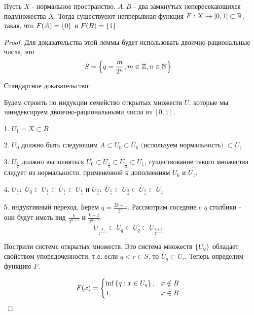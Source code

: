 \begin{theorem}
    Пусть $X$ - нормальное пространство. $A, B$ - два замкнутых непересекающихся подмножества $X$. Тогда существуеют непрерывная функция $F: X \rightarrow [0, 1] \subset \mathbb{R}$, такая, что $F(A) = \left\{0\right\}$ и $F(B) = \left\{1\right\}$
\end{theorem}
\begin{proof}
    Для доказательства этой леммы будет использовать двоично-рациональные числа, это
    \[
        S = \left\{q = \frac{m}{2^n}, m \in \mathbb{Z}, n \in \mathbb{N}\right\}
    \]

    Стандартное доказательство: 
        
        Будем строить по индукции семейство открытых множеств $U$, которые мы заиндексируем двоично-рациональными числа из $[0, 1]$.
        
            1. $U_1 = X \subset B$
            
            2. $U_0$ должно быть следующим $A \subset U_0 \subset \overline{U}_0 \textbf{ (используем нормальность) } \subset U_1$

            3. $U_{\frac{1}{2}}$ должно выполняться $\overline{U}_0 \subset U_{\frac{1}{2}} \subset \overline{U}_{\frac{1}{2}} \subset U_1$, cуществование такого множества следует из нормальности, примененной к дополнениям $U_0$ и $U_1$.

            4. $U_{\frac{1}{4}}:$ $\overline{U}_0 \subset U_{\frac{1}{4}} \subset \overline{U}_{\frac{1}{4}} \subset U_{\frac{1}{2}}$ и $U_{\frac{3}{4}}:$ $\overline{U}_\frac{1}{2} \subset U_{\frac{3}{4}} \subset \overline{U}_{\frac{3}{4}} \subset U_{1}$

            5. индуктивный переход. Берем $q = \frac{2k + 1}{2^n}$. Рассмотрим соседние c $q$ столбики - они будут иметь вид $\frac{k}{2^{n - 1}}$ и $\frac{k + 1}{2^{n - 1}}$.
            \[
                \overline{U}_{\frac{k}{2^{n - 1}}} \subset U_q \subset \overline{U}_q \subset U_{\frac{k + 1}{2^{n - 1}}}
            \]

        Пострили системс открытых множеств. Это система множеств $\left\{U_q\right\}$ обладает свойством упорядоченности, т.е. если $q < r \in S$, то $\overline{U}_q \subset U_r$. Теперь определим функцию $F$.


        \[
            F(x) = 
                \begin{cases}
                    \inf\left\{q : x \in U_q\right\}, & x \notin B \\
                    1, & x \in B
                \end{cases}
        \]


\end{proof}
